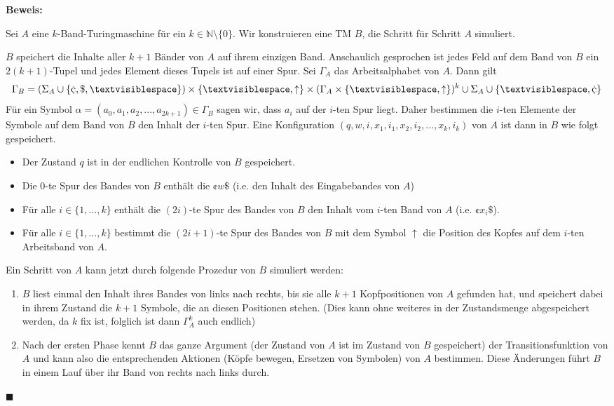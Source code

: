 \documentclass[a4paper, 11pt]{article}
\def\N{\mathbb{N}}
\begin{document}
    \textbf{Beweis: }

    Sei $A$ eine $k$-Band-Turingmaschine für ein $k \in \N \setminus \{0\}$. Wir konstruieren eine TM $B$, die Schritt für Schritt $A$ simuliert.

    $B$ speichert die Inhalte aller $k+1$ Bänder von $A$ auf ihrem einzigen Band. Anschaulich gesprochen ist jedes Feld auf dem Band von $B$ ein $2(k+1)$-Tupel und jedes Element dieses Tupels ist auf einer Spur. 
    Sei $\Gamma_A$ das Arbeitsalphabet von $A$. Dann gilt 
    $$\Gamma_B = (\Sigma_A \cup \{\cent, \$, \textvisiblespace\}) \times \{\textvisiblespace,\uparrow\} \times (\Gamma_A \times \{\textvisiblespace, \uparrow\})^k \cup \Sigma_A \cup \{\textvisiblespace, \cent\}$$
    Für ein Symbol $\alpha = (a_0,a_1,a_2,...,a_{2k+1}) \in \Gamma_B$ sagen wir, dass $a_i$ auf der $i$-ten Spur liegt. Daher bestimmen die $i$-ten Elemente der Symbole auf dem Band von $B$ den Inhalt der $i$-ten Spur. Eine Konfiguration $(q,w,i,x_1,i_1,x_2,i_2,...,x_k,i_k)$ von $A$ ist dann in $B$ wie folgt gespeichert. 
    \begin{itemize}
        \item Der Zustand $q$ ist in der endlichen Kontrolle von $B$ gespeichert. 
        \item Die $0$-te Spur des Bandes von $B$ enthält die $\cent w\$$ (i.e. den Inhalt des Eingabebandes von $A$)
        \item Für alle $i \in \{1, ..., k\}$ enthält die $(2i)$-te Spur des Bandes von $B$ den Inhalt vom $i$-ten Band von $A$ (i.e. $\cent x_i\$$).
        \item Für alle $i \in \{1, ..., k\}$ bestimmt die $(2i +1)$-te Spur des Bandes von $B$ mit dem Symbol $\uparrow$ die Position des Kopfes auf dem $i$-ten Arbeitsband von $A$.
    \end{itemize}
    Ein Schritt von $A$ kann jetzt durch folgende Prozedur von $B$ simuliert werden:
    \begin{enumerate}
        \item $B$ liest einmal den Inhalt ihres Bandes von links nach rechts, bis sie alle $k+1$ Kopfpositionen von $A$ gefunden hat, und speichert dabei in ihrem Zustand die $k+1$ Symbole, die an diesen Positionen stehen. (Dies kann ohne weiteres in der Zustandsmenge abgespeichert werden, da $k$ fix ist, folglich ist dann $\Gamma_A^k$ auch endlich)
        \item Nach der ersten Phase kennt $B$ das ganze Argument (der Zustand von $A$ ist im Zustand von $B$ gespeichert) der Transitionsfunktion von $A$ und kann also die entsprechenden Aktionen (Köpfe bewegen, Ersetzen von Symbolen) von $A$ bestimmen. Diese Änderungen führt $B$ in einem Lauf über ihr Band von rechts nach links durch.
    \end{enumerate}
    \hspace*{0pt}\hfill$\blacksquare$
\end{document}
